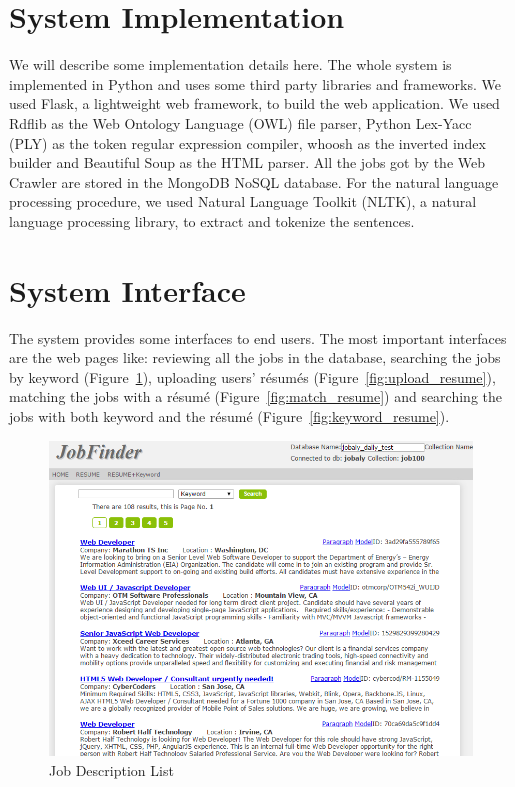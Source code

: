 \section{System Implementation}

We will describe some implementation details here. The whole system is implemented in Python and uses some third party libraries and frameworks. We used Flask, a lightweight web framework, to build the web application. We used Rdflib as the Web Ontology Language (OWL) file parser, Python Lex-Yacc (PLY) as the token regular expression compiler, whoosh as the inverted index builder and Beautiful Soup as the HTML parser.  All the jobs got by the Web Crawler are stored in the MongoDB NoSQL database.  For the natural language processing procedure, we used Natural Language Toolkit (NLTK), a  natural language processing library, to extract and  tokenize the sentences.

\section{System Interface}

The system provides some interfaces to end users. The most important interfaces are the web pages like: reviewing all the jobs in the database, searching the jobs by keyword (Figure~\ref{fig:joblist}),  uploading users' r\'esum\'es (Figure~\ref{fig:upload_resume}),  matching the jobs with a r\'esum\'e (Figure~\ref{fig:match_resume}) and searching the jobs with both keyword and the r\'esum\'e (Figure~\ref{fig:keyword_resume}).

\begin{figure}[htbp]
  \centering
  \includegraphics[scale=0.5]{images/joblist.png}
  \caption{Job Description List}
  \label{fig:joblist}
\end{figure}


